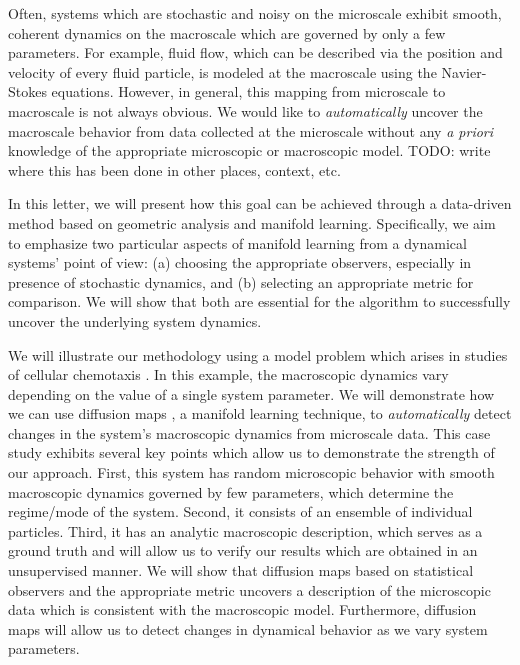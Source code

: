 \documentclass[prl, reprint, final, showkeys]{revtex4-1}
\begin{document}

\maketitle

 
Often, systems which are stochastic and noisy on the microscale exhibit smooth, coherent dynamics on the macroscale which are governed by only a few parameters.
%
For example, fluid flow, which can be described via the position and velocity of every fluid particle, is modeled at the macroscale using the Navier-Stokes equations.
%
However, in general, this mapping from microscale to macroscale is not always obvious.
%
We would like to {\em automatically} uncover the macroscale behavior from data collected at the microscale without any {\em a priori} knowledge of the appropriate microscopic or macroscopic model.
%
TODO: write where this has been done in other places, context, etc.

In this letter, we will present how this goal can be achieved through a data-driven method based on geometric analysis and manifold learning. Specifically, we aim to emphasize two particular aspects of manifold learning from a dynamical systems' point of view: (a) choosing the appropriate observers, especially in presence of stochastic dynamics, and (b) selecting an appropriate metric for comparison. 
%
We will show that both are essential for the algorithm to successfully uncover the underlying system dynamics.

We will illustrate our methodology using a model problem which arises in studies of cellular chemotaxis \cite{othmer2000diffusion}.
%
In this example, the macroscopic dynamics vary depending on the value of a single system parameter.
%
We will demonstrate how we can use diffusion maps \cite{coifman2005geometric}, a manifold learning technique, to {\em automatically} detect changes in the system's macroscopic dynamics from microscale data.
%
This case study exhibits several key points which allow us to demonstrate the strength of our approach.
%
First, this system has random microscopic behavior with smooth macroscopic dynamics governed by few parameters, which determine the regime/mode of the system. 
%
Second, it consists of an ensemble of individual particles. 
%
Third, it has an analytic macroscopic description, which serves as a ground truth and will allow us to verify our results which are obtained in an unsupervised manner.
%
We will show that diffusion maps based on statistical observers and the appropriate metric uncovers a description of the microscopic data which is consistent with the macroscopic model.
%
Furthermore, diffusion maps will allow us to detect changes in dynamical behavior as we vary system parameters. 
\end{document}
